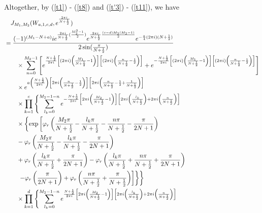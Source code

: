 \documentclass[10pt,a4paper]{article}
\newcommand{\lt}{\left}
\newcommand{\rt}{\right}
\begin{document}
\iffalse
Altogether, by (\ref{t1}) - (\ref{t8}) and (\ref{t'3}) - (\ref{t11}), we have
\begin{align}
&\quad J_{M_1, M_2} (W_{a,1,c,d}, e^{\frac{2\pi i}{N+\frac{1}{2}}}) \notag \\
&=\frac{ (-1)^{(M_1 - N+a) } i  e^{\frac{2\pi i}{N+\frac{1}{2}}( \frac{M_2^2-1}{2})}e^{\frac{2\pi i}{N+\frac{1}{2}}\frac{(c-d)M_2(M_2-1)}{2}}  e^{- \frac{a}{4}(2\pi i)(N+\frac{1}{2})} }{2\sin(\frac{\pi}{N+\frac{1}{2}})} \notag \\
&\qquad \times \sum_{n=0}^{M_2-1} 
 \lt[e^{\frac{N+\frac{1}{2}}{2\pi i} \lt[ (2\pi i)\lt(\frac{M_1}{N+\frac{1}{2}}-1\rt)\rt] \lt[ (2\pi i)\lt( \frac{n}{N+\frac{1}{2}} -\frac{1}{2} \rt) \rt] } + e^{-\frac{N+\frac{1}{2}}{2\pi i} \lt[ (2\pi i)\lt(\frac{M_1}{N+\frac{1}{2}}-1\rt)\rt] \lt[ (2\pi i)\lt( \frac{n}{N+\frac{1}{2}} -\frac{1}{2} \rt) \rt] }\rt] \notag \\
&\qquad \times e^{a \lt(\frac{N+\frac{1}{2}}{2\pi i} \rt) \lt[2\pi i \lt(\frac{n}{N+\frac{1}{2}} -\frac{1}{2} \rt) \rt] \lt[ 2\pi i \lt(\frac{n}{N+\frac{1}{2}} -\frac{1}{2} + \frac{1}{N+\frac{1}{2}}  \rt) \rt]}  \notag \\
&\qquad \times \prod_{k=1}^c \lt\{ \sum_{l_k=0}^{M_2-1-n}   e^{- \frac{N+\frac{1}{2}}{2\pi i} \lt[ 2\pi i \lt(\frac{M_2}{N+\frac{1}{2}} -1 \rt) \rt]\lt[ 2\pi i \lt(\frac{l_k}{N+\frac{1}{2}}\rt) + 2\pi i \lt( \frac{n}{N+\frac{1}{2}}\rt) \rt] } \rt.\notag\\ 
&\qquad \times \lt\{\exp\lt[\varphi_r \lt(\frac{M_2\pi}{N+\frac{1}{2}} - \frac{l_k\pi}{N+\frac{1}{2}} - \frac{n\pi}{N+\frac{1}{2}} - \frac{\pi}{2N+1}\rt)\rt. \rt. \notag\\
&\qquad  - \varphi_r\lt(\frac{M_2\pi}{N+\frac{1}{2}} - \frac{l_k\pi}{N+\frac{1}{2}} - \frac{\pi}{2N+1}\rt) \notag \\
&\qquad  + \varphi_r \lt(\frac{l_k\pi}{N+\frac{1}{2}} + \frac{\pi}{2N+1}\rt)  - \varphi_r\lt( \frac{l_k\pi}{N+\frac{1}{2}} + \frac{n\pi}{N+\frac{1}{2}} + \frac{\pi}{2N+1}\rt) \notag\\
&\lt.\lt.\lt.\qquad  - \varphi_r \lt(  \frac{\pi}{2N+1}\rt)  + \varphi_r\lt( \frac{n\pi}{N+\frac{1}{2}} + \frac{\pi}{N+\frac{1}{2}}\rt) \rt] \rt\}  \rt\} \notag\\
&\qquad \times \prod_{k=1}^d \lt\{ \sum_{l_k=0}^{M_2-1-n}   e^{ \frac{N+\frac{1}{2}}{2\pi i} \lt[ 2\pi i \lt(\frac{M_2}{N+\frac{1}{2}} -1 \rt) \rt]\lt[ 2\pi i \lt(\frac{l_k}{N+\frac{1}{2}}\rt) + 2\pi i \lt( \frac{n}{N+\frac{1}{2}}\rt) \rt] } \rt.\notag\\ 

\end{align}
\end{document}
